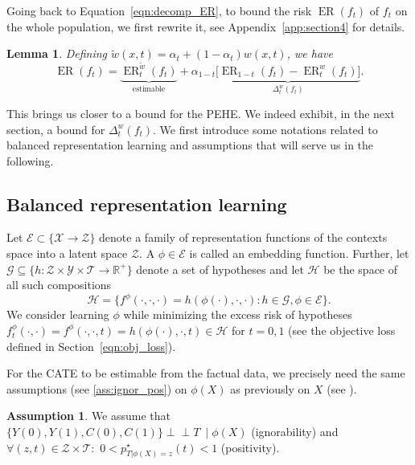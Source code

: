 \documentclass[12pt]{article}
\theoremstyle{plain}
\newtheorem{lemma}[theorem]{Lemma}
\theoremstyle{definition}
\newtheorem{assumption}[theorem]{Assumption}
\theoremstyle{remark}
\DeclareMathOperator{\ER}{\text{ER}}
\newcommand\independent{\perp \!\!\! \perp }
\begin{document}
Going back to Equation~\eqref{eqn:decomp_ER}, to bound the risk $\ER(f_t)$ of $f_{t}$ on the whole population,  we first rewrite it, see Appendix~\ref{app:section4} for details.
\begin{lemma} \label{lemma:decom}Defining $\tilde{w}( x,t) =\alpha _{t} +( 1-\alpha _{t})w(x,t)$, we have
\begin{equation*}
    \ER( f _{t}) =\underbrace{ \ER^{\tilde{w}}_{t}( f_{t}) }_{\text{estimable}}+ \alpha _{1-t}\underbrace{\Big[ \ER_{1-t}( f_{t}) -\ER^{w}_{t}( f _{t})\Big]}_{\Delta_{t}^w( f_{t})}.
\end{equation*}
\end{lemma}
This brings us closer to a bound for the PEHE. We indeed exhibit, in the next section, a bound for $\Delta_{t}^w( f_{t})$. We first introduce some notations related to balanced representation learning and assumptions that will serve us in the following.
\subsection{Balanced representation learning}

Let $\mathcal{E} \subset\{\mathcal{X} \to \mathcal{Z}\}$ denote a family of representation functions of the contexts space into a latent space $\mathcal{Z}$. A $\phi \in \mathcal{E}$ is called an embedding function. Further, let $\mathcal{G} \subseteq\{h: \mathcal{Z} \times \mathcal{Y} \times \mathcal{T} \to \mathbb{R}^+ \}$ denote a set of hypotheses and let $\mathcal{H}$ be the space of all such compositions
\begin{equation*}
    \mathcal{H}=\{f^\phi(\cdot,\cdot,\cdot)=h(\phi(\cdot),\cdot,\cdot): h \in \mathcal{G}, \phi \in \mathcal{E}\}.
\end{equation*}
We consider learning $\phi$ while minimizing the excess risk of hypotheses $f_t^\phi(\cdot,\cdot)=f^\phi(\cdot,\cdot,t)=h(\phi(\cdot),\cdot,t)\in \mathcal{H}$ for $t=0,1$ (see the objective loss defined in Section~\ref{eqn:obj_loss}).

For the CATE to be estimable from the factual data, we precisely need the same assumptions (see \ref{ass:ignor_pos}) on $\phi(X)$ as previously on $X$  (see \cite{johansson2020generalization}).
\begin{assumption}\label{ass:ignor_pos_phi}
We assume that $\{Y(0) ,Y(1),C(0),C(1)\} \independent T\ \mid \phi(X)$ (ignorability) and $\forall (z, t) \in  \mathcal{Z} \times \mathcal{T}:$ $0< p^\star_{T | \phi(X)=z}(t) < 1$ (positivity).
\end{assumption}
\end{document}
